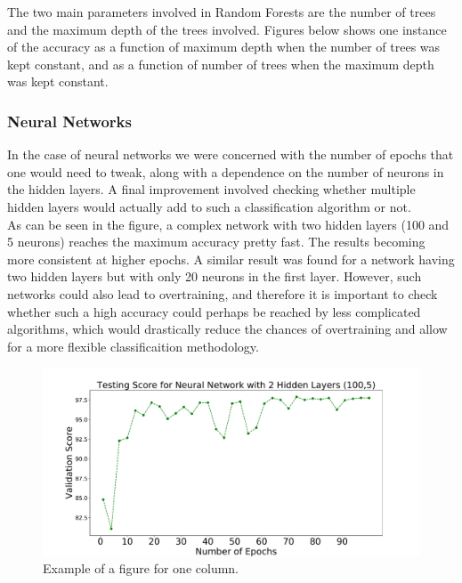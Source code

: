 The two main parameters involved in Random Forests are the number of trees and the maximum depth of the trees involved. Figures below shows one instance of the accuracy as a function of maximum depth when the number of trees was kept constant, and as a function of number of trees when the maximum depth was kept constant. \\


\subsubsection{Neural Networks}

In the case of neural networks we were concerned with the number of epochs that one would need to tweak, along with a dependence on the number of neurons in the hidden layers. A final improvement involved checking whether multiple hidden layers would actually add to such a classification algorithm or not.\\
As can be seen in the figure, a complex network with two hidden layers (100 and 5 neurons) reaches the maximum accuracy pretty fast. The results becoming more consistent at higher epochs. A similar result was found for a network having two hidden layers but with only 20 neurons in the first layer. However, such networks could also lead to overtraining, and therefore it is important to check whether such a high accuracy could perhaps be reached by less complicated algorithms, which would drastically reduce the chances of overtraining and allow for a more flexible classificaition methodology.\\

\begin{figure}[h]
\includegraphics[width=\onepic\textwidth]{plots/epochsvsscore_10seeds_100_2}
\caption{
Example of a figure for one column.
}
\label{fig:Maps_data}
\end{figure}

